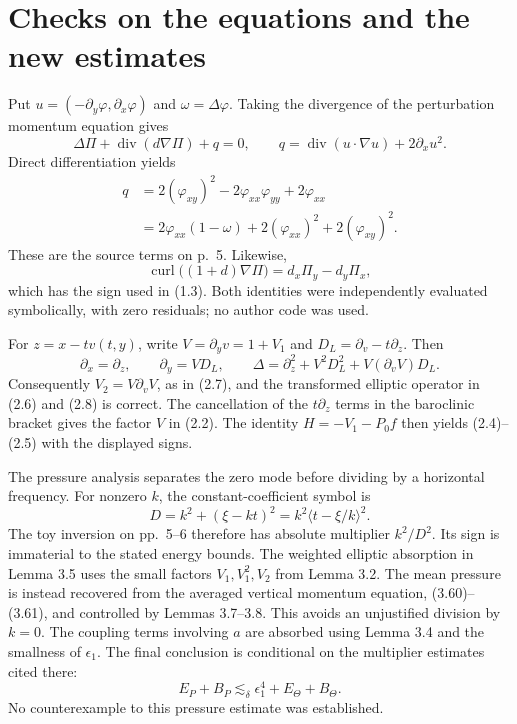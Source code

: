\documentclass[10pt]{article}
\begin{document}
\section*{Checks on the equations and the new estimates}
Put \(u=(-\partial_y\varphi,\partial_x\varphi)\) and \(\omega=\Delta\varphi\). Taking the divergence of the perturbation momentum equation gives \[\Delta\Pi+\operatorname{div}(d\nabla\Pi)+q=0,\qquad
 q=\operatorname{div}(u\cdot\nabla u)+2\partial_xu^2.\] Direct differentiation yields \[\begin{aligned}
 q&=2(\varphi_{xy})^2-2\varphi_{xx}\varphi_{yy}+2\varphi_{xx}\\
  &=2\varphi_{xx}(1-\omega)+2(\varphi_{xx})^2+2(\varphi_{xy})^2.\end{aligned}\] These are the source terms on p. 5. Likewise, \[\operatorname{curl}\bigl((1+d)\nabla\Pi\bigr)
       =d_x\Pi_y-d_y\Pi_x,\] which has the sign used in (1.3). Both identities were independently evaluated symbolically, with zero residuals; no author code was used.\par
For \(z=x-tv(t,y)\), write \(V=\partial_yv=1+V_1\) and \(D_L=\partial_v-t\partial_z\). Then \[\partial_x=\partial_z,\qquad \partial_y=VD_L,\qquad
 \Delta=\partial_z^2+V^2D_L^2+V(\partial_vV)D_L.\] Consequently \(V_2=V\partial_vV\), as in (2.7), and the transformed elliptic operator in (2.6) and (2.8) is correct. The cancellation of the \(t\partial_z\) terms in the baroclinic bracket gives the factor \(V\) in (2.2). The identity \(H=-V_1-P_0f\) then yields (2.4)–(2.5) with the displayed signs.\par
The pressure analysis separates the zero mode before dividing by a horizontal frequency. For nonzero \(k\), the constant-coefficient symbol is \[D=k^2+(\xi-kt)^2=k^2\langle t-\xi/k\rangle^2.\] The toy inversion on pp. 5–6 therefore has absolute multiplier \(k^2/D^2\). Its sign is immaterial to the stated energy bounds. The weighted elliptic absorption in Lemma 3.5 uses the small factors \(V_1,V_1^2,V_2\) from Lemma 3.2. The mean pressure is instead recovered from the averaged vertical momentum equation, (3.60)–(3.61), and controlled by Lemmas 3.7–3.8. This avoids an unjustified division by \(k=0\). The coupling terms involving \(a\) are absorbed using Lemma 3.4 and the smallness of \(\epsilon_1\). The final conclusion is conditional on the multiplier estimates cited there: \[E_P+B_P\lesssim_\delta \epsilon_1^4+E_\Theta+B_\Theta.\] No counterexample to this pressure estimate was established.\par
\end{document}
